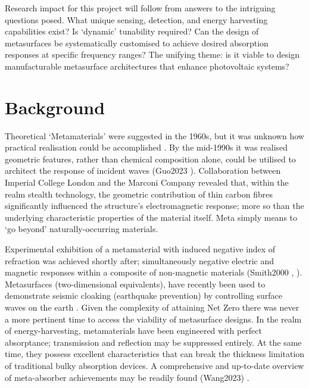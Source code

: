 Research impact for this project will follow from answers to the intriguing questions posed. What unique sensing, detection, and energy harvesting capabilities exist? Is `dynamic' tunability required? Can the design of metasurfaces be systematically customised to achieve desired absorption responses at specific frequency ranges? The unifying theme: is it viable to design manufacturable metasurface architectures that enhance photovoltaic systems?


\section{Background}

Theoretical ‘Metamaterials’ were suggested in the 1960s, but it was unknown how practical realisation could be accomplished \cite{veselago1968}. By the mid-1990s it was realised geometric features, rather than chemical composition alone, could be utilised to architect the response of incident waves (Guo2023 \cite{Guo2023}). Collaboration between Imperial College London and the Marconi Company revealed that, within the realm stealth technology, the geometric contribution of thin carbon fibres significantly influenced the structure's electromagnetic response; more so than the underlying characteristic properties of the material itself. Meta simply means to `go beyond’ naturally-occurring materials.

Experimental exhibition of a metamaterial with induced negative index of refraction was achieved shortly after; simultaneously negative electric and magnetic responses within a composite of non-magnetic materials (Smith2000 \cite{smith2000}, \cite{shelby2001}).
Metasurfaces (two-dimensional equivalents), have recently been used to demonstrate seismic cloaking (earthquake prevention) by controlling surface waves on the earth \cite{palermo2018}.
Given the complexity of attaining Net Zero there was never a more pertinent time to access the viability of metasurface designs.
In the realm of energy-harvesting, metamaterials have been engineered with perfect absorptance; transmission and reflection may be suppressed entirely. At the same time, they possess excellent characteristics that can break the thickness limitation of traditional bulky absorption devices. A comprehensive and up-to-date overview of meta-absorber achievements may be readily found (Wang2023) \cite{wang2023broadband}.

